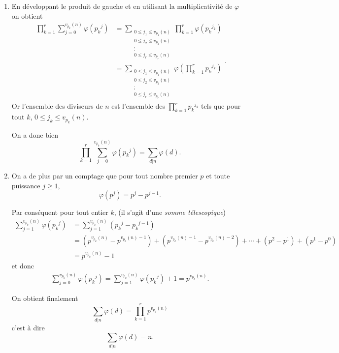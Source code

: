 \begin{sol}
    \begin{enumerate}
        \item  En développant le produit de gauche et en utilisant la multiplicativité de $\varphi$ on obtient
              \[\begin{aligned}
                      \prod_{k=1}^r \sum_{j=0}^{v_{p_k}(n)} \varphi({p_k}^j) & = \sum_{\substack{ 0 \leq j_1 \leq v_{p_1}(n) \\ 0 \leq j_2 \leq v_{p_2}(n) \\ \vdots\\  0 \leq j_r \leq v_{p_r}(n)
                          }}\prod_{k=1}^r \varphi({p_k}^{j_k})                                                               \\
                                                                             & = \sum_{\substack{ 0 \leq j_1 \leq v_{p_1}(n) \\ 0 \leq j_2 \leq v_{p_2}(n) \\ \vdots\\  0 \leq j_r \leq v_{p_r}(n)
                          }}\varphi\left(\prod_{k=1}^r {p_k}^{j_k}\right)
                  \end{aligned} .\]
              Or l'ensemble des diviseurs de $n$ est l'ensemble des $\prod_{k=1}^r {p_k}^{j_k}$ tels que pour tout $k$, $0 \leq j_k \leq v_{p_k}(n)$.

              On a donc bien
              \[\boxed{\prod_{k=1}^r \sum_{j=0}^{v_{p_k}(n)} \varphi({p_k}^j) = \sum_{d | n} \varphi(d)}.\]
        \item On a de plus par un comptage que pour tout nombre premier $p$ et toute puissance $j\geq 1$,
              \[\varphi(p^j) = p^j-p^{j-1}.\]

              Par conséquent pour tout entier $k$, (il s'agit d'une \emph{somme télescopique})
              \[\begin{aligned}
                      \sum_{j=1}^{v_{p_k}(n)} \varphi({p_k}^j) & = \sum_{j=1}^{v_{p_k}(n)} \left( {p_k}^j - {p_k}^{j-1}\right)                                                                                                         \\
                                                               & = \left(p^{v_{p_k}(n)} - p^{v_{p_k}(n)-1}\right) + \left(p^{v_{p_k}(n)-1} - p^{v_{p_k}(n)-2}\right) + \cdots + \left(p^{2} - p^{1}\right)+ \left(p^{1} - p^{0}\right) \\
                                                               & = p^{v_{p_k}(n)}-1
                  \end{aligned} \]
              et donc
              \[\begin{aligned}
                      \sum_{j=0}^{v_{p_k}(n)} \varphi({p_k}^j) = \sum_{j=1}^{v_{p_k}(n)} \varphi({p_k}^j) +1  = p^{v_{p_k}(n)}.
                  \end{aligned}\]

              On obtient finalement
              \[ \sum_{d | n} \varphi(d) = \prod_{k=1}^r p^{v_{p_k}(n)}\]
              c'est à dire
              \[\boxed{ \sum_{d | n} \varphi(d) = n}.\]
    \end{enumerate}
\end{sol}
